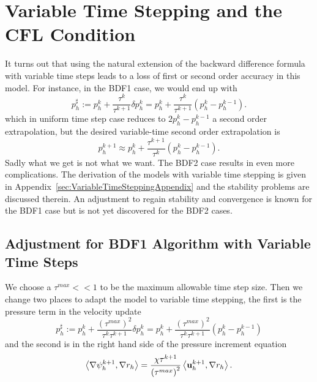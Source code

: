\documentclass[letterpaper]{erdc}
\begin{document}
%
%
%
\section{Variable Time Stepping and the CFL Condition}\label{sec:VariableTimeSteppingAndCFL}

It turns out that using the natural extension of the backward difference formula with variable time steps leads to a loss of first or second order accuracy in this model.  For instance, in the BDF1 case, we would end up with
\begin{equation}
  p^{\sharp}_h := p_h^{k} + \frac{\tau^{k}}{\tau^{k+1}}\delta p_h^{k} = p_h^{k} + \frac{\tau^{k}}{\tau^{k+1}}\left( p_h^{k} - p_h^{k-1} \right).
\end{equation}
which in uniform time step case reduces to $2p^k_h-p_h^{k-1}$ a second order extrapolation, but the desired variable-time second order extrapolation is 
\begin{equation}
  p^{k+1}_h \approx p_h^{k} + \frac{\tau^{k+1}}{\tau^{k}}\left( p_h^{k} - p_h^{k-1} \right).
\end{equation}
Sadly what we get is not what we want.  The BDF2 case results in even more complications.  The derivation of the models with variable time stepping is given in Appendix~\ref{sec:VariableTimeSteppingAppendix} and the stability problems are discussed therein.  An adjustment to regain stability and convergence is known for the BDF1 case but is not yet discovered for the BDF2 cases.


%
%
\subsection{Adjustment for BDF1 Algorithm with Variable Time Steps}
We choose a $\tau^{max}<<1$ to be the maximum allowable time step size.  Then we change two places to adapt the model to variable time stepping, the first is the pressure term in the velocity update
\begin{equation}
  p^{\sharp}_h := p_h^{k} + \frac{\left(\tau^{max}\right)^2}{\tau^{k}\tau^{k+1}}\delta p_h^{k} = p_h^{k} + \frac{\left(\tau^{max}\right)^2}{\tau^{k}\tau^{k+1}}\left( p_h^{k} - p_h^{k-1} \right)
\end{equation}
and the second is in the right hand side of the pressure increment equation
\begin{equation}
  \left\langle \nabla\psi_h^{k+1}, \nabla r_h \right\rangle = \frac{\chi\tau^{k+1}}{\left(\tau^{max}\right)^2}\left\langle \textbf{u}_h^{k+1}, \nabla r_h \right\rangle.
\end{equation}
\end{document}
